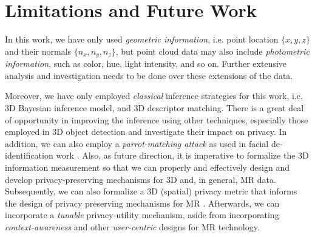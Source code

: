 \section{Limitations and Future Work}\label{sec:future_work}
In this work, we have only used \textit{geometric information}, i.e. point location $\{x,y,z\}$ and their normals $\{n_x,n_y,n_z\}$, but point cloud data may also include \textit{photometric information}, such as color, hue, light intensity, and so on. Further extensive analysis and investigation needs to be done over these extensions of the data.

Moreover, we have only employed \textit{classical} inference strategies for this work, i.e. 3D Bayesian inference model, and 3D descriptor matching. There is a great deal of opportunity in improving the inference using other techniques, especially those employed in 3D object detection \cite{xiang2014beyond,yang2018pixor,simon2018complex} and investigate their impact on privacy. In addition, we can also employ a \textit{parrot-matching attack} as used in facial de-identification work \cite{gross2009face}. Also, as future direction, it is imperative to formalize the 3D information measurement so that we can properly and effectively design and develop privacy-preserving mechanisms for 3D and, in general, MR data. Subsequently, we can also formalize a 3D (spatial) privacy metric that informs the design of privacy preserving mechanisms for MR  \cite{ Wagner:2018:TPM:3212709.3168389}. Afterwards, we can incorporate a \textit{tunable} privacy-utility mechanism, aside from incorporating \textit{context-awareness} \cite{grubert2017pervasiveAR} and other \textit{user-centric} designs for MR technology.



